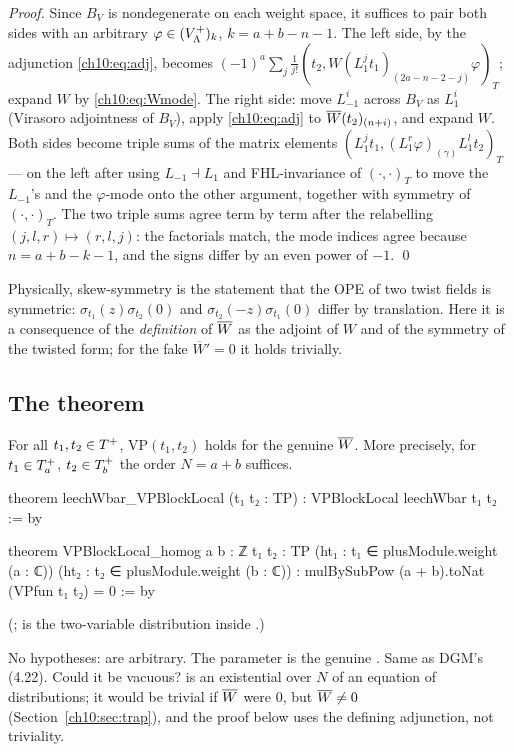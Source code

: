 \emph{Proof.} Since $B_V$ is nondegenerate on each weight space, it suffices to pair both sides
with an arbitrary $\varphi\in(V_{\Lambda}^{+})_k$, $k=a+b-n-1$.  The left side, by the adjunction
\eqref{ch10:eq:adj}, becomes $(-1)^a\sum_j\frac1{j!}(t_2,W(L_1^jt_1)_{(2a-n-2-j)}\varphi)_T$; expand
$W$ by \eqref{ch10:eq:Wmode}.  The right side: move $L_{-1}^i$ across $B_V$ as $L_1^i$ (Virasoro
adjointness of $B_V$), apply \eqref{ch10:eq:adj} to $\overline{W}(t_2)_{(n+i)}$, and expand $W$.  Both
sides become triple sums of the matrix elements $(L_1^jt_1,(L_1^r\varphi)_{(\gamma)}L_1^lt_2)_T$
--- on the left after using $L_{-1}\dashv L_1$ and FHL-invariance of $(\cdot,\cdot)_T$ to move the
$L_{-1}$'s and the $\varphi$-mode onto the other argument, together with symmetry of
$(\cdot,\cdot)_T$.  The two triple sums agree term by term after the relabelling
$(j,l,r)\mapsto(r,l,j)$: the factorials match, the mode indices agree because $n=a+b-k-1$, and
the signs differ by an even power of $-1$. \qed

\begin{remark}
Physically, skew-symmetry is the statement that the OPE of two twist fields is symmetric:
$\sigma_{t_1}(z)\sigma_{t_2}(0)$ and $\sigma_{t_2}(-z)\sigma_{t_1}(0)$ differ by translation.  Here
it is a consequence of the \emph{definition} of $\overline{W}$ as the adjoint of $W$ and of the
symmetry of the twisted form; for the fake $\overline W'=0$ it holds trivially.
\end{remark}

\subsection{The theorem}

\begin{theorem}[DGM (4.22)]\label{ch10:thm:422}
For all $t_1,t_2\in T^{+}$, $\mathrm{VP}(t_1,t_2)$ holds for the genuine $\overline{W}$.  More
precisely, for $t_1\in T^{+}_a$, $t_2\in T^{+}_b$ the order $N=a+b$ suffices.
\end{theorem}
\begin{leancode}
theorem leechWbar_VPBlockLocal (t₁ t₂ : TP) : VPBlockLocal leechWbar t₁ t₂ := by

theorem VPBlockLocal_homog {a b : ℤ} {t₁ t₂ : TP} (ht₁ : t₁ ∈ plusModule.weight (a : ℂ))
    (ht₂ : t₂ ∈ plusModule.weight (b : ℂ)) :
    mulBySubPow (a + b).toNat (VPfun t₁ t₂) = 0 := by
\end{leancode}
(;  is the two-variable distribution
inside .)
\begin{dictionary}
No hypotheses:  are arbitrary.  The parameter is the genuine .
Same as DGM's (4.22).  Could it be vacuous?   is an existential over $N$ of an
equation of distributions; it would be trivial if $\overline{W}$ were $0$, but $\overline{W}\ne0$
(Section~\ref{ch10:sec:trap}), and the proof below uses the defining adjunction, not triviality.
\end{dictionary}

